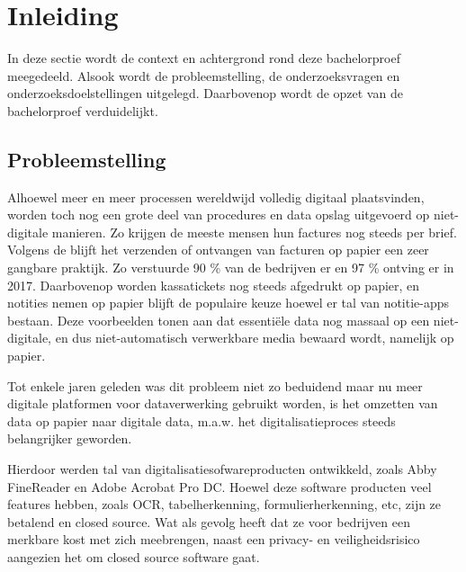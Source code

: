 
\chapter{Inleiding}
\label{ch:inleiding}

In deze sectie wordt de context en achtergrond rond deze bachelorproef meegedeeld. Alsook wordt de probleemstelling, de onderzoeksvragen en onderzoeksdoelstellingen uitgelegd. Daarbovenop wordt de opzet van de bachelorproef verduidelijkt. 

\section{Probleemstelling}
\label{sec:probleemstelling}

Alhoewel meer en meer processen wereldwijd volledig digitaal plaatsvinden, worden toch nog een grote deel van procedures en data opslag uitgevoerd op niet-digitale manieren. Zo krijgen de meeste mensen hun factures nog steeds per brief. Volgens de \textcite{FederaleOverheidsdienstEconomie} blijft het verzenden of ontvangen van facturen op papier een zeer gangbare praktijk. Zo verstuurde 90 \% van de bedrijven er en 97 \% ontving er in 2017. Daarbovenop worden kassatickets nog steeds afgedrukt op papier, en notities nemen op papier blijft de populaire keuze hoewel er tal van notitie-apps bestaan. Deze voorbeelden tonen aan dat essentiële data nog massaal op een niet-digitale, en dus niet-automatisch verwerkbare media bewaard wordt, namelijk op papier.

Tot enkele jaren geleden was dit probleem niet zo beduidend maar nu meer digitale
platformen voor dataverwerking gebruikt worden, is het omzetten van data op papier naar
digitale data, m.a.w. het digitalisatieproces steeds belangrijker geworden.

Hierdoor werden tal van digitalisatiesofwareproducten ontwikkeld, zoals Abby FineReader
en Adobe Acrobat Pro DC. Hoewel deze software producten veel features hebben, zoals \Gls{OCR}, tabelherkenning, formulierherkenning, etc, zijn ze betalend en closed source. Wat als gevolg heeft dat ze voor bedrijven een merkbare kost met zich meebrengen, naast een privacy- en veiligheidsrisico aangezien het om closed source software gaat.


